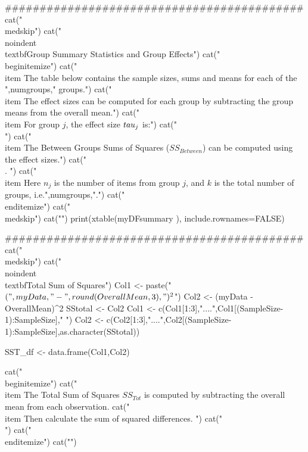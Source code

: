 ###########################################
cat("\n\\medskip")
cat("\n\n\\noindent \\textbf{Group Summary Statistics and Group Effects}") 
cat("\n\\begin{itemize}")
cat("\n\\item The table below contains the sample sizes, sums and means for each of the ",numgroups," groups.")
cat("\n\\item The effect sizes can be computed for each group by subtracting the group means from the overall mean.")
cat("\n\\item For group $j$, the effect size $\\tau_{j}$ is:")
cat("\n \\[ \\tau_{j}  = \\bar{y}_{Tot} - \\bar{y}_{j} , \\]  ")
cat("\n\\item The Between Groups Sums of Squares ($SS_{Between}$) can be computed using the effect sizes.")
cat("\n \\[ SS_{Between}  = \\sum{j=1}^{k} n_j \\times \\tau_{j}^2 \\] . ")
cat("\n\\item Here $n_j$ is the number of items from group $j$, and $k$ is the total number of groups, i.e.",numgroups,".")
cat("\n\\end{itemize}")
cat("\n\\medskip")
cat("\n")
print(xtable(myDFsummary ), include.rownames=FALSE)


###########################################
cat("\n\\medskip")
cat("\n\n\\noindent \\textbf{Total Sum of Squares}")
Col1 <- paste("$(",myData,"-",round(OverallMean,3),")^2$")
Col2 <- (myData - OverallMean)^2  %
SStotal <- Col2 %
Col1 <- c(Col1[1:3],"....",Col1[(SampleSize-1):SampleSize]," ")
Col2 <- c(Col2[1:3],"....",Col2[(SampleSize-1):SampleSize],as.character(SStotal))

SST_df <- data.frame(Col1,Col2)


cat("\n\\begin{itemize}")
cat("\n\\item The Total Sum of Squares $SS_{Tot}$ is computed by subtracting the overall mean from each observation.
cat("\n\\item Then calculate the sum of squared differences. ")
cat("\n \\[ SS_{Tot} = s^2_{y} = \\sum (y_{i} - \\bar{y}_{Tot})^2  . \\]  ")
cat("\n\\end{itemize}")
cat("\n")

